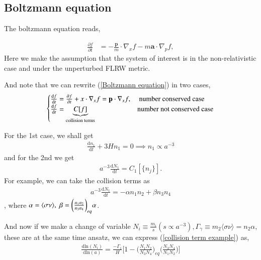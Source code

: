 \documentclass[a4paper, 12pt]{article}
\begin{document}
{{  \subsection{Boltzmann equation}%
    \label{sub:Boltzmann equation}
   
   The boltzmann equation reads, 

   \begin{align}
    \label{boltzmann equation}
    \frac{\partial f}{\partial t} &= - \frac{\textbf{p}}{m} \cdot \nabla_x
     f - m \textbf{a} \cdot \nabla_p f, 
   \end{align}
   Here we make the assumption that the system of interest is in the
   non-relativistic case and under the unperturbed FLRW metric. 

   And note that we can rewrite (\ref{Boltzmann equation}) in two cases, 
   \begin{align}
   \begin{cases} 
     \frac{\mathrm{d}f}{\mathrm{d}t} = \frac{\partial f}{\partial
     t} + x \cdot \nabla_x f = \textbf{p} \cdot \nabla_x f, &\textnormal{
     number conserved case} \\ 
     \frac{\mathrm{d}f}{\mathrm{d}t} =
     \underbrace{C[f]}_{\textrm{collision terms}} &\textnormal{number
     not conserved case}
   \end{cases}
    \end{align}

    For the 1st case, we shall get 
    \begin{align}
      \label{first case beyond}
      \frac{\mathrm{d}n_1}{\mathrm{d}t} + 3 H n_1 = 0 \implies n_1
      \propto a^{-3} 
    \end{align}
    and for the 2nd we get 
    \begin{align}
      \label{second case beyond}
      a^{-3} \frac{\mathrm{d}N_1}{\mathrm{d}t} = C_1 [ \{ n_j \} ].
    \end{align}
    For example, we can take the collision terms as 
    \begin{align}
      \label{collison term example}
       a^{-3} \frac{\mathrm{d}N_1}{\mathrm{d}t} = - \alpha
       n_1 n_2 + \beta  n_3 n_4
    \end{align}, where \( \alpha = \langle \sigma \nu \rangle,
    \hspace{0.1cm} \beta = \bigg( \frac{n_1 n_2}{n_3 n_4}
    \bigg)_{eq} \alpha     \).

    And now if we make a change of variable \( N_i \equiv
    \frac{m_i}{s} (s \propto a^{-3} ), \Gamma_{\gamma} \equiv m_2 \langle
    \sigma \nu  \rangle  = n_2 \alpha\), these are at the same time
    ansatz, 
we can express (\ref{collision term example}) as, 
\begin{align}
  \label{neater collision term}
  \frac{\mathrm{d} \mathrm{ln}(N_i)}{\mathrm{d}\mathrm{ln}(a)}  = \frac{- \Gamma_1}{H} \bigg[ 1 -
  \bigg(\frac{N_1 N_2}{N_3 N_4} \bigg)_{eq} \bigg( \frac{N_3 N_4}{N_1
  N_2} \bigg)  \bigg] 
\end{align}

}}
\end{document}
